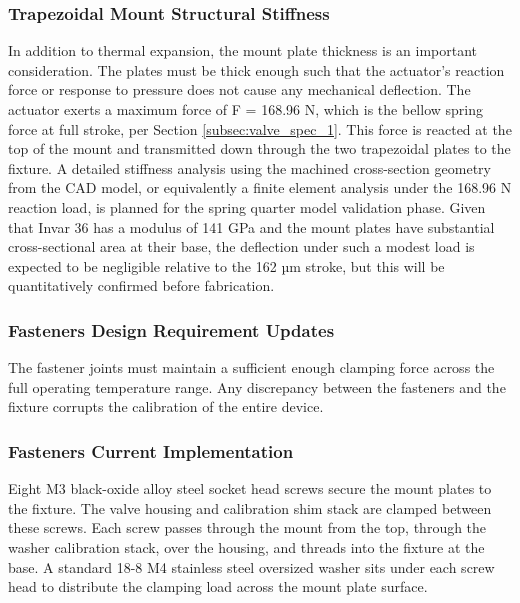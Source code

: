 \documentclass[12pt, letterpaper]{report}%
\newcounter{mycounter}           %
\newcounter{sub}[mycounter]      %
\begin{document}
        \subsubsection{Trapezoidal Mount Structural Stiffness}
        In addition to thermal expansion, the mount plate thickness is an important consideration. The plates must be thick enough such that the actuator's reaction force or response to pressure does not cause any mechanical deflection. The actuator exerts a maximum force
         of F = 168.96 N, which is the bellow spring force at full stroke, per Section \ref{subsec:valve_spec_1}. This force is reacted at the top of the mount and transmitted down through the two trapezoidal plates to the fixture. A detailed stiffness analysis using the machined cross-section geometry from the CAD model, or equivalently a finite element analysis under the 168.96 N reaction load, is planned for the spring quarter model validation phase. 
         Given that Invar 36 has a modulus of 141 GPa and the mount plates have substantial cross-sectional area at their base, the deflection under such a modest load is expected to be negligible relative to the 162 µm stroke, but this will be quantitatively confirmed before fabrication.
        
        \subsubsection{Fasteners Design Requirement Updates}
        The fastener joints must maintain a sufficient enough clamping force across the full operating temperature range. Any discrepancy between the fasteners and the fixture corrupts the calibration of the entire device.

        \subsubsection{Fasteners Current Implementation}
        Eight M3 black-oxide alloy steel socket head screws secure the mount plates to the fixture. The valve housing and calibration shim stack are clamped between these screws. Each screw passes through the mount from the top, through the washer calibration stack, over the housing, and threads into the fixture at the base.
        A standard 18-8 M4 stainless steel oversized washer sits under each screw head to distribute the clamping load across the mount plate surface. 
        
\end{document}
